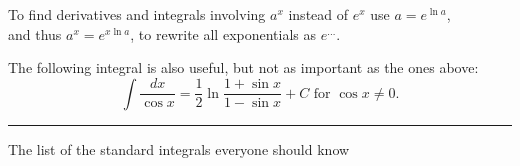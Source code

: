 \begin{table}[bt]
  To find derivatives and integrals involving $a^x$ instead of $e^x$ use
  $a = e^{\ln a}$,\\
  and thus $a^{x} = e^{x\ln a}$, to rewrite all exponentials as $e^{\ldots}$.
  \smallskip

  The following integral is also useful, but not as important as the
  ones above:
  \[
  \int \frac{ d x}{\cos x} = \frac12 \ln\frac{1+\sin x}{1-\sin x} +C
  \text{ for }\cos x\neq 0.
  \]
  \rule[6pt]{\textwidth}{2pt}
  \caption{The list of the standard integrals everyone should know}
  \label{tbl:standard-integrals}
\end{table}



